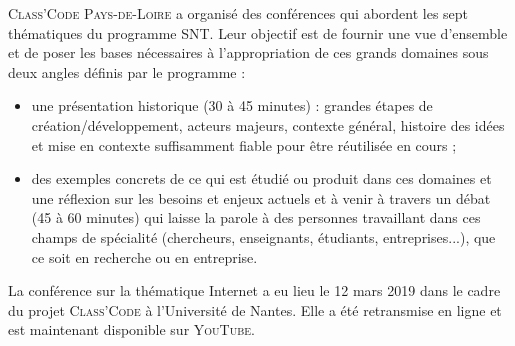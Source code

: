\textsc{Class'Code} \textsc{Pays-de-Loire} a organisé des conférences qui abordent les sept thématiques du programme SNT. Leur objectif est de fournir une vue d’ensemble et de poser les bases nécessaires à l’appropriation de ces grands domaines sous deux angles définis par le programme :
\begin{itemize}
\item une présentation historique (30 à 45 minutes) : grandes étapes de création/développement, acteurs majeurs, contexte général, histoire des idées et mise en contexte suffisamment fiable pour être réutilisée en cours ;
\item des exemples concrets de ce qui est étudié ou produit dans ces domaines et une réflexion sur les besoins et enjeux actuels et à venir à travers un débat (45 à 60 minutes) qui laisse la parole à des personnes travaillant dans ces champs de spécialité  (chercheurs, enseignants, étudiants, entreprises...), que ce soit en recherche ou en entreprise.
\end{itemize}

La conférence sur la thématique Internet a eu lieu le 12 mars 2019 dans le cadre du projet \textsc{Class'Code} à l’Université de Nantes. Elle a été retransmise en ligne et est maintenant disponible sur \textsc{YouTube}.

